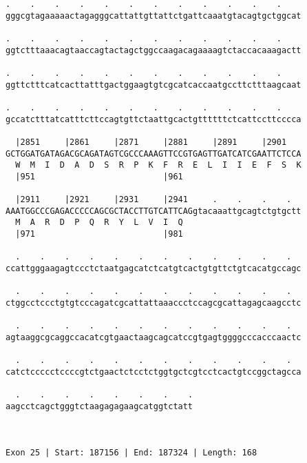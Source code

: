\documentclass{article}
\begin{document}
\begin{Verbatim}
.    .    .    .    .    .    .    .    .    .    .    .    
gggcgtagaaaaactagagggcattattgttattctgattcaaatgtacagtgctggcat
                                                            
.    .    .    .    .    .    .    .    .    .    .    .    
ggtctttaaacagtaaccagtactagctggccaagacagaaaagtctaccacaaagactt
                                                            
.    .    .    .    .    .    .    .    .    .    .    .    
ggttctttcatcacttatttgactggaagtgtcgcatcaccaatgccttctttaagcaat
                                                            
.    .    .    .    .    .    .    .    .    .    .    .    
gccatctttatcatttcttccagtgttctaattgcactgttttttctcattccttcccca
                                                            
  |2851     |2861     |2871     |2881     |2891     |2901   
GCTGGATGATAGACGCAGATAGTCGCCCAAAGTTCCGTGAGTTGATCATCGAATTCTCCA
  W  M  I  D  A  D  S  R  P  K  F  R  E  L  I  I  E  F  S  K
  |951                          |961                        
  
  |2911     |2921     |2931     |2941     .    .    .    .  
AAATGGCCCGAGACCCCCAGCGCTACCTTGTCATTCAGgtacaaattgcagtctgtgctt
  M  A  R  D  P  Q  R  Y  L  V  I  Q                        
  |971                          |981                        
  
  .    .    .    .    .    .    .    .    .    .    .    .  
ccattgggaagagtccctctaatgagcatctcatgtcactgtgttctgtcacatgccagc
                                                            
  .    .    .    .    .    .    .    .    .    .    .    .  
ctggcctccctgtgtcccagatcgcattattaaaccctccagcgcattagagcaagcctc
                                                            
  .    .    .    .    .    .    .    .    .    .    .    .  
agtaaggcgcaggccacatcgtgaactaagcagcatccgtgagtggggcccacccaactc
                                                            
  .    .    .    .    .    .    .    .    .    .    .    .  
catctccccctccccgtctgaactctcctctggtgctcgtcctcactgtccggctagcca
                                                            
  .    .    .    .    .    .    .    .
aagcctcagctgggtctaagagagaagcatggtctatt
                                      
                                      
 
Exon 25 | Start: 187156 | End: 187324 | Length: 168




\end{Verbatim}
\end{document}
